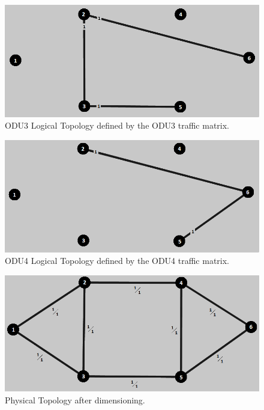 \begin{figure}[H]
\centering
\includegraphics[width=13cm]{sdf/heuristic/opaque_survivability/low/logical_topology_odu3_low}
\caption{ODU3 Logical Topology defined by the ODU3 traffic matrix.}
\label{logical_ODU3_surv_ref_low_heuristic}
\end{figure}

\begin{figure}[H]
\centering
\includegraphics[width=13cm]{sdf/heuristic/opaque_survivability/low/logical_topology_odu4_low}
\caption{ODU4 Logical Topology defined by the ODU4 traffic matrix.}
\label{logical_ODU4_surv_ref_low_heuristic}
\end{figure}

\begin{figure}[H]
\centering
\includegraphics[width=13cm]{sdf/heuristic/opaque_survivability/low/physical_topology_low}
\caption{Physical Topology after dimensioning.}
\label{physical_topology_surv_ref_low_heuristic}
\end{figure}

